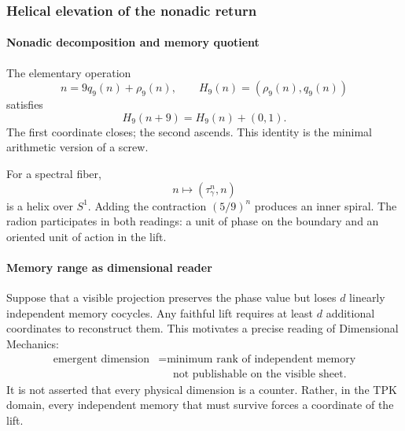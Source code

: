 \subsubsection{Helical elevation of the nonadic return}

\paragraph{Nonadic decomposition and memory quotient}

The elementary operation
\begin{equation}
n=9q_9(n)+\rho_9(n),
\qquad
H_9(n)=(\rho_9(n),q_9(n))
\label{eq:H9}
\end{equation}
satisfies
\begin{equation}
H_9(n+9)=H_9(n)+(0,1).
\label{eq:H9-helix}
\end{equation}
The first coordinate closes; the second ascends. This identity is the
minimal arithmetic version of a screw.

For a spectral fiber,
\[
n\longmapsto(\tau_\gamma^n,n)
\]
is a helix over \(S^1\). Adding the contraction \((5/9)^n\) produces an
inner spiral. The radion participates in both readings: a unit of phase
on the boundary and an oriented unit of action in the lift.

\paragraph{Memory range as dimensional reader}

Suppose that a visible projection preserves the phase value but loses \(d\) linearly independent memory cocycles. Any faithful lift requires at least \(d\) additional coordinates to reconstruct them. This motivates a precise reading of Dimensional Mechanics:
\begin{equation}
\begin{aligned}
\text{emergent dimension}
&=\text{minimum rank of independent memory}\\
&\phantom{=}\text{not publishable on the visible sheet}.
\end{aligned}
\label{eq:dimension-memory}
\end{equation}
It is not asserted that every physical dimension is a counter. Rather, in the
TPK domain, every independent memory that must survive forces a
coordinate of the lift.

